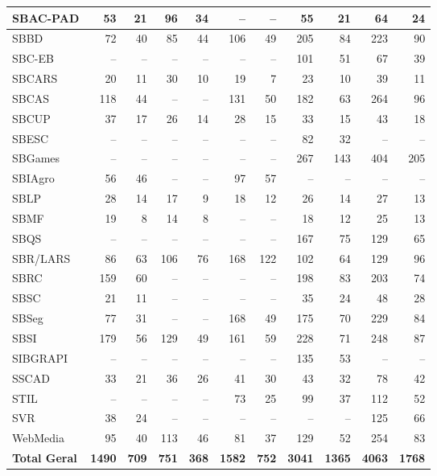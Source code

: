 \begin{table}[H]
\begin{tabular}{|l|rr|rr|rr|rr|rr|}
SBAC-PAD & 53 & 21 & 96 & 34 & -- & -- & 55 & 21 & 64 & 24 \\ \hline
SBBD & 72 & 40 & 85 & 44 & 106 & 49 & 205 & 84 & 223 & 90 \\ \hline
SBC-EB & -- & -- & -- & -- & -- & -- & 101 & 51 & 67 & 39 \\ \hline
SBCARS & 20 & 11 & 30 & 10 & 19 & 7 & 23 & 10 & 39 & 11 \\ \hline
SBCAS & 118 & 44 & -- & -- & 131 & 50 & 182 & 63 & 264 & 96 \\ \hline
SBCUP & 37 & 17 & 26 & 14 & 28 & 15 & 33 & 15 & 43 & 18 \\ \hline
SBESC & -- & -- & -- & -- & -- & -- & 82 & 32 & -- & -- \\ \hline
SBGames & -- & -- & -- & -- & -- & -- & 267 & 143 & 404 & 205 \\ \hline
SBIAgro & 56 & 46 & -- & -- & 97 & 57 & -- & -- & -- & -- \\ \hline
SBLP & 28 & 14 & 17 & 9 & 18 & 12 & 26 & 14 & 27 & 13 \\ \hline
SBMF & 19 & 8 & 14 & 8 & -- & -- & 18 & 12 & 25 & 13 \\ \hline
SBQS & -- & -- & -- & -- & -- & -- & 167 & 75 & 129 & 65 \\ \hline
SBR/LARS & 86 & 63 & 106 & 76 & 168 & 122 & 102 & 64 & 129 & 96 \\ \hline
SBRC & 159 & 60 & -- & -- & -- & -- & 198 & 83 & 203 & 74 \\ \hline
SBSC & 21 & 11 & -- & -- & -- & -- & 35 & 24 & 48 & 28 \\ \hline
SBSeg & 77 & 31 & -- & -- & 168 & 49 & 175 & 70 & 229 & 84 \\ \hline
SBSI & 179 & 56 & 129 & 49 & 161 & 59 & 228 & 71 & 248 & 87 \\ \hline
SIBGRAPI & -- & -- & -- & -- & -- & -- & 135 & 53 & -- & -- \\ \hline
SSCAD & 33 & 21 & 36 & 26 & 41 & 30 & 43 & 32 & 78 & 42 \\ \hline
STIL & -- & -- & -- & -- & 73 & 25 & 99 & 37 & 112 & 52 \\ \hline
SVR & 38 & 24 & -- & -- & -- & -- & -- & -- & 125 & 66 \\ \hline
WebMedia & 95 & 40 & 113 & 46 & 81 & 37 & 129 & 52 & 254 & 83 \\ \hline
\textbf{Total Geral} & \textbf{1490} & \textbf{709} & \textbf{751} & \textbf{368} & \textbf{1582} & \textbf{752} & \textbf{3041} & \textbf{1365} & \textbf{4063} & \textbf{1768} \\ \hline
\end{tabular}

\end{table}